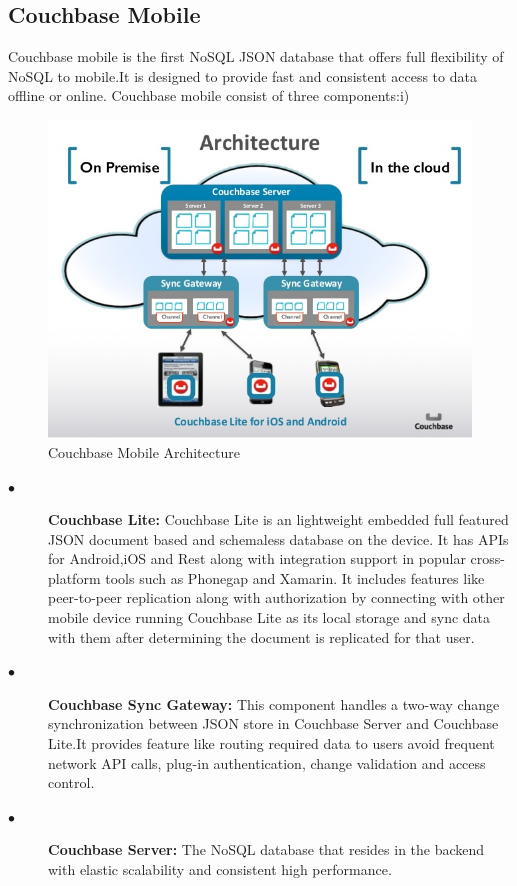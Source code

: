 			 

\subsection{Couchbase Mobile}

		Couchbase mobile is the first NoSQL JSON database that offers full flexibility of NoSQL to mobile.It is designed to provide fast and consistent access to data offline or online. Couchbase mobile consist of three components:i) 

\begin{figure}[!htb]
  \includegraphics[width=\linewidth]{figures/Couchbase-Mobile-IOT-Database.jpg}
	 \caption{Couchbase Mobile Architecture}
  \label{fig: Couchbase Mobile Architecture}
\end{figure}			

		
\begin{description}
  \item[$\bullet$] {\bfseries Couchbase Lite:} Couchbase Lite is an lightweight embedded full featured JSON  document based and schemaless database on the device. It has APIs for Android,iOS and Rest along with integration support in popular cross-platform tools such as Phonegap and Xamarin. It includes features like peer-to-peer replication along with authorization by connecting with other mobile device running Couchbase Lite as its local storage and sync data with them after determining the document is replicated for that user.
 
    \item[$\bullet$] {\bfseries Couchbase Sync Gateway:} This component handles a two-way change synchronization between JSON store in Couchbase Server and Couchbase Lite.It  provides feature like routing required data to users avoid frequent network API calls, plug-in authentication, change validation and access control. 

  \item[$\bullet$] {\bfseries Couchbase Server:}	The NoSQL database that resides in the backend with elastic scalability and consistent high performance.
  
\end{description}


